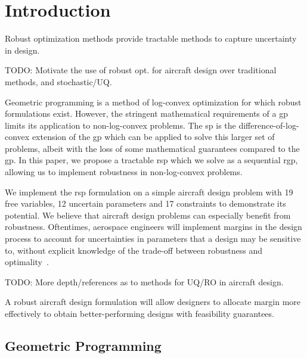 \section{Introduction}
Robust optimization methods provide tractable methods to capture uncertainty in design.

TODO: Motivate the use of robust opt. for aircraft design over traditional methods, and stochastic/UQ.

Geometric programming is a method of log-convex optimization for which robust formulations exist.
However, the stringent mathematical requirements of a \gls{gp} limits its application to non-log-convex problems.
The \gls{sp} is the difference-of-log-convex extension of the \gls{gp} which can be applied to
solve this larger set of problems, albeit with the loss of some mathematical guarantees compared to the \gls{gp}.
In this paper, we propose a tractable \gls{rsp} which we solve as a sequential \gls{rgp},
allowing us to implement robustness in non-log-convex problems.

We implement the \gls{rsp} formulation on a simple aircraft design problem with 19 free variables,
12 uncertain parameters and 17 constraints to demonstrate its potential. We believe that aircraft design
problems can especially benefit from robustness. Oftentimes, aerospace engineers will implement
margins in the design process to account for uncertainties in parameters that a design may be sensitive to,
without explicit knowledge of the trade-off between robustness and optimality~\cite{yao2011}.

TODO: More depth/references as to methods for UQ/RO in aircraft design.

A robust aircraft design formulation will allow designers to allocate margin more effectively
to obtain better-performing designs with feasibility guarantees.

\subsection{Geometric Programming}

